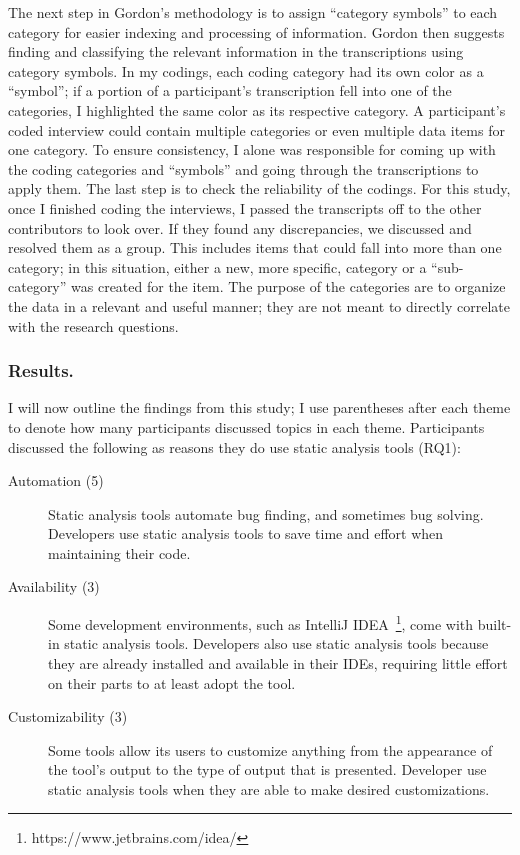 \documentclass{llncs}
\begin{document}
The next step in Gordon's methodology is to assign ``category symbols'' to each category for easier indexing and processing of information. Gordon then suggests finding and classifying the relevant information in the transcriptions using category symbols. In my codings, each coding category had its own color as a ``symbol''; if a portion of a participant's transcription fell into one of the categories, I highlighted the same color as its respective category. A participant's coded interview could contain multiple categories or even multiple data items for one category. To ensure consistency, I alone was responsible for coming up with the coding categories and ``symbols'' and going through the transcriptions to apply them. The last step is to check the reliability of the codings. For this study, once I finished coding the interviews, I passed the transcripts off to the other contributors to look over. If they found any discrepancies, we discussed and resolved them as a group. This includes items that could fall into more than one category; in this situation, either a new, more specific, category or a ``sub-category'' was created for the item. The purpose of the categories are to organize the data in a relevant and useful manner; they are not meant to directly correlate with the research questions.

\subsubsection{Results.} I will now outline the findings from this study; I use parentheses after each theme to denote how many participants discussed topics in each theme. 
Participants discussed the following as reasons they do use static analysis tools (RQ1): 
\begin{description}
	\item[Automation (5)] Static analysis tools automate bug finding, and sometimes bug solving. Developers use static analysis tools to save time and effort when maintaining their code.
	\item[Availability (3)] Some development environments, such as IntelliJ IDEA~\footnote{https://www.jetbrains.com/idea/}, come with built-in static analysis tools. Developers also use static analysis tools because they are already installed and available in their IDEs, requiring little effort on their parts to at least adopt the tool.
	\item[Customizability (3)] Some tools allow its users to customize anything from the appearance of the tool's output to the type of output that is presented. Developer use static analysis tools when they are able to make desired customizations.
\end{description}
\end{document}
